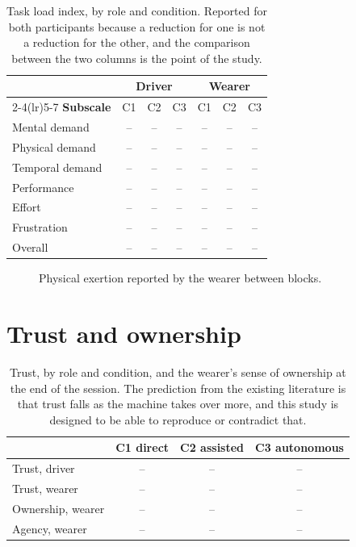 \begin{table}[htbp]
  \centering
  \small
  \caption[Workload]{Task load index, by role and condition. Reported for both
  participants because a reduction for one is not a reduction for the other,
  and the comparison between the two columns is the point of the study.}
  \label{tab:tlx}
  \begin{tabular}{@{}lcccccc@{}}
    \toprule
    & \multicolumn{3}{c}{\textbf{Driver}} &
      \multicolumn{3}{c}{\textbf{Wearer}} \\
    \cmidrule(lr){2-4}\cmidrule(lr){5-7}
    \textbf{Subscale} & C1 & C2 & C3 & C1 & C2 & C3 \\
    \midrule
    Mental demand & -- & -- & -- & -- & -- & -- \\
    Physical demand & -- & -- & -- & -- & -- & -- \\
    Temporal demand & -- & -- & -- & -- & -- & -- \\
    Performance & -- & -- & -- & -- & -- & -- \\
    Effort & -- & -- & -- & -- & -- & -- \\
    Frustration & -- & -- & -- & -- & -- & -- \\
    \midrule
    Overall & -- & -- & -- & -- & -- & -- \\
    \bottomrule
  \end{tabular}
\end{table}

\begin{figure}[htbp]
  \centering
  \caption[Exertion]{Physical exertion reported by the wearer between blocks.}
  \label{fig:exertion}
\end{figure}

\section{Trust and ownership}

\begin{table}[htbp]
  \centering
  \small
  \caption[Trust and ownership]{Trust, by role and condition, and the
  wearer's sense of ownership at the end of the session. The prediction from
  the existing literature is that trust falls as the machine takes over more,
  and this study is designed to be able to reproduce or contradict that.}
  \label{tab:trust}
  \begin{tabular}{@{}lccc@{}}
    \toprule
    & \textbf{C1 direct} & \textbf{C2 assisted} & \textbf{C3 autonomous} \\
    \midrule
    Trust, driver & -- & -- & -- \\
    Trust, wearer & -- & -- & -- \\
    Ownership, wearer & -- & -- & -- \\
    Agency, wearer & -- & -- & -- \\
    \bottomrule
  \end{tabular}
\end{table}

